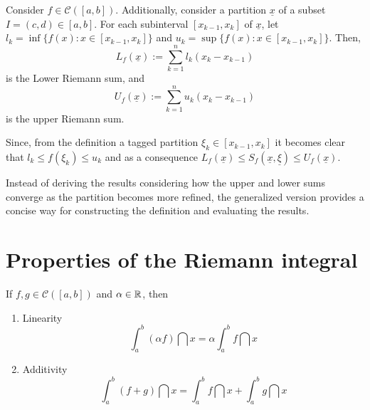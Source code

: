 \begin{definition}
    Consider $f \in \mathcal{C}([a,b])$. Additionally, consider a partition $\underline{x}$ of a subset $I = (c,d) \in [a,b]$. For each subinterval $[x_{k-1}, x_k]$ of $\underline{x}$, let $l_k = \inf \{f(x) : x \in [x_{k-1}, x_k]\}$ and $u_k = \sup \{f(x) : x \in [x_{k-1}, x_k]\}$. Then,
    \begin{equation}
        L_f(\underline{x}) := \sum \limits_{k=1}^n l_k (x_k - x_{k-1})
    \end{equation}
    is the Lower Riemann sum, and
    \begin{equation}
        U_f(\underline{x}) := \sum \limits_{k=1}^n u_k (x_k - x_{k-1})
    \end{equation}
    is the upper Riemann sum.
\end{definition}

Since, from the definition a tagged partition $\xi_k \in [x_{k-1}, x_k]$ it becomes clear that $l_k \leq f(\xi_k) \leq u_k$ and as a consequence $L_f(\underline{x}) \leq S_f(\underline{x}, \underline{\xi}) \leq U_f(\underline{x})$.

Instead of deriving the results considering how the upper and lower sums converge as the partition becomes more refined, the generalized version provides a concise way for constructing the definition and evaluating the results.

\section{Properties of the Riemann integral}

\begin{theorem}
    If $f, g \in \mathcal{C}([a,b])$ and $\alpha \in \mathbb{R}$, then
    \begin{enumerate}
        \item Linearity
            \begin{equation}
                \int_a^b (\alpha f) \dint x = \alpha \int_a^b f \dint x
            \end{equation}
        \item Additivity
            \begin{equation}
                \int_a^b (f + g)\dint x = \int_a^b f \dint x + \int_a^b g \dint x
            \end{equation}
    \end{enumerate}
\end{theorem}

